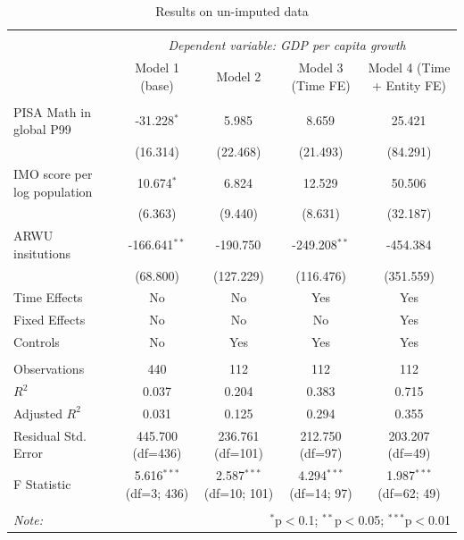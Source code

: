 \documentclass[11pt]{article}
\begin{document}
\begin{table}[H] \centering
    \caption{Results on un-imputed data}
    \label{table:reg-noimpute}
    \resizebox{\linewidth}{!} {
    \begin{tabular}{@{\extracolsep{5pt}}lcccc}
    \\[-1.8ex]\hline
    \hline \\[-1.8ex]
    & \multicolumn{4}{c}{\textit{Dependent variable: GDP per capita growth}} \
    \cr \cline{2-5}
    \\[-1.8ex] & \multicolumn{1}{c}{Model 1 (base)} & \multicolumn{1}{c}{Model 2} & \multicolumn{1}{c}{Model 3 (Time FE)} & \multicolumn{1}{c}{Model 4 (Time + Entity FE)}  \\
    \hline \\[-1.8ex]
     PISA Math in global P99 & -31.228$^{*}$ & 5.985$^{}$ & 8.659$^{}$ & 25.421$^{}$ \\
    & (16.314) & (22.468) & (21.493) & (84.291) \\
     IMO score per log population & 10.674$^{*}$ & 6.824$^{}$ & 12.529$^{}$ & 50.506$^{}$ \\
    & (6.363) & (9.440) & (8.631) & (32.187) \\
     ARWU insitutions & -166.641$^{**}$ & -190.750$^{}$ & -249.208$^{**}$ & -454.384$^{}$ \\
    & (68.800) & (127.229) & (116.476) & (351.559) \\
     Time Effects & No & No & Yes & Yes \\
     Fixed Effects & No & No & No & Yes \\
     Controls & No & Yes & Yes & Yes \\
    \hline \\[-1.8ex]
     Observations & 440 & 112 & 112 & 112 \\
     $R^2$ & 0.037 & 0.204 & 0.383 & 0.715 \\
     Adjusted $R^2$ & 0.031 & 0.125 & 0.294 & 0.355 \\
     Residual Std. Error & 445.700 (df=436) & 236.761 (df=101) & 212.750 (df=97) & 203.207 (df=49) \\
     F Statistic & 5.616$^{***}$ (df=3; 436) & 2.587$^{***}$ (df=10; 101) & 4.294$^{***}$ (df=14; 97) & 1.987$^{***}$ (df=62; 49) \\
    \hline
    \hline \\[-1.8ex]
    \textit{Note:} & \multicolumn{4}{r}{$^{*}$p$<$0.1; $^{**}$p$<$0.05; $^{***}$p$<$0.01} \\
    \end{tabular}
    }
\end{table}
\end{document}

